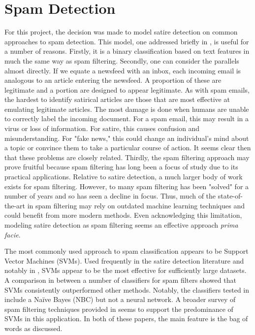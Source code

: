 \documentclass [12 pt] {report}
\begin{document}
\section{Spam Detection} \label{ch2.2}
For this project, the decision was made to model satire detection on common approaches to spam detection. This model, one addressed briefly in \cite{Burfoot}, is useful for a number of reasons. Firstly, it is a binary classification based on text features in much the same way as spam filtering. Secondly, one can consider the parallels almost directly. If we equate a newsfeed with an inbox, each incoming email is analogous to an article entering the newsfeed. A proportion of these are legitimate and a portion are designed to appear legitimate. As with spam emails, the hardest to identify satirical articles are those that are most effective at emulating legitimate articles.
The most damage is done when humans are unable to correctly label the incoming document. For a spam email, this may result in a virus or loss of information. For satire, this causes confusion and misunderstanding. For "fake news," this could change an individual's mind about a topic or convince them to take a particular course of action. It seems clear then that these problems are closely related. Thirdly, the spam filtering approach may prove fruitful because spam filtering has long been a focus of study due to its practical applications. Relative to satire detection, a much larger body of work exists for spam filtering. However, to many spam filtering has been "solved" for a number of years and so has seen a decline in focus. Thus, much of the state-of-the-art in spam filtering may rely on outdated machine learning techniques and could benefit from more modern methods. Even acknowledging this limitation, modeling satire detection as spam filtering seems an effective approach \textit{prima facie}.

The most commonly used approach to spam classification appears to be Support Vector Machines (SVMs). Used frequently in the satire detection literature and notably in \cite{Burfoot}, SVMs appear to be the most effective for sufficiently large datasets. A comparison in \cite{Zhang} between a number of classifiers for spam filters showed that SVMs consistently outperformed other methods. Notably, the classifiers tested in \cite{Zhang} include a Na{\"i}ve Bayes (NBC) but not a neural network. A broader survey of spam filtering techniques provided in \cite{Blanzieri} seems to support the predominance of SVMs in this application. In both of these papers, the main feature is the bag of words as discussed.
\end{document}

